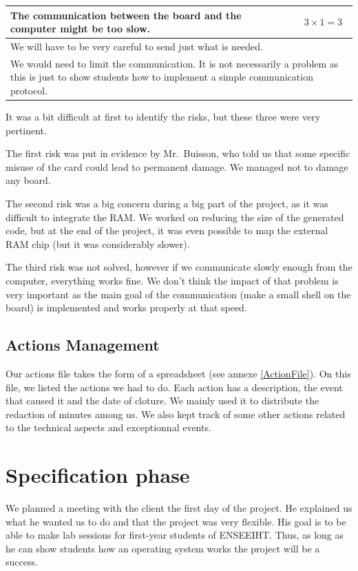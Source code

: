 \documentclass[openany, a4paper]{book}
\newcommand{\risk}[4]{%
  \noindent
  \begin{center}
    \begin{tabular}{|p{0.8\textwidth}|c|}
        \hline
        #2 & $#1$
      \\\hline
        \multicolumn{2}{|p{0.9\textwidth}|}{#3}
      \\\hline
        \multicolumn{2}{|p{0.9\textwidth}|}{#4}
      \\\hline
    \end{tabular}
  \end{center}
}
\begin{document}
        \risk{3 \times 1 = 3}{
          The communication between the board and the computer might be too
          slow.
        }{
          We will have to be very careful to send just what is needed.
        }{
          We would need to limit the communication. It is not necessarily a
          problem as this is just to show students how to implement a simple
          communication protocol.
        }

        It was a bit difficult at first to identify the risks, but these three
        were very pertinent.

        The first risk was put in evidence by Mr.\ Buisson, who told us that
        some specific misuse of the card could lead to permanent damage. We
        managed not to damage any board.

        The second risk was a big concern during a big part of the project, as
        it was difficult to integrate the RAM. We worked on reducing the size of
        the generated code, but at the end of the project, it was even possible
        to map the external RAM chip (but it was considerably slower).

        The third risk was not solved, however if we communicate slowly enough
        from the computer, everything works fine. We don't think the impact of
        that problem is very important as the main goal of the communication
        (make a small shell on the board) is implemented and works properly at
        that speed.

    \section{Actions Management}
    Our actions file takes the form of a spreadsheet (see annexe
    \ref{ActionFile}). On this file, we listed the actions we had to do. Each
    action has a description, the event that caused it and the date of cloture.
    We mainly used it to distribute the redaction of minutes among us. We also
    kept track of some other actions related to the technical aspects and
    exceptionnal events.

  \chapter{Specification phase}
    We planned a meeting with the client the first day of the project. He
    explained us what he wanted us to do and that the project was very flexible.
    His goal is to be able to make lab sessions for first-year students of
    ENSEEIHT. Thus, as long as he can show students how an operating system
    works the project will be a success.
\end{document}
